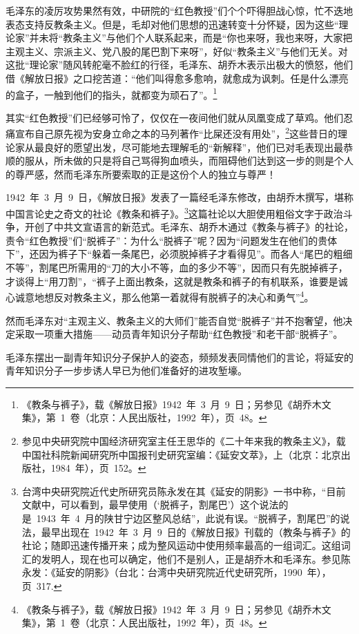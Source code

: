 毛泽东的凌厉攻势果然有效，中研院的“红色教授”们个个吓得胆战心惊，忙不迭地表态支持反教条主义。但是，毛却对他们思想的迅速转变十分怀疑，因为这些“理论家”并未将“教条主义”与他们个人联系起来，而是“你也来呀，我也来呀，大家把主观主义、宗派主义、党八股的尾巴割下来呀”，好似“教条主义”与他们无关。对这批“理论家”随风转舵毫不脸红的行径，毛泽东、胡乔木表示出极大的愤怒，他们借《解放日报》之口挖苦道：“他们叫得愈多愈响，就愈成为讽刺。任是什么漂亮的盒子，一触到他们的指头，就都变为顽石了”。\footnote{《教条与裤子》，载《解放日报》1942~年~3~月~9~日；另参见《胡乔木文集》，第~1~卷（北京：人民出版社，1992~年），页~48。}

其实“红色教授”们已经够可怜了，仅仅在一夜间他们就从凤凰变成了草鸡。他们忍痛宣布自己原先视为安身立命之本的马列著作“比屎还没有用处”，\footnote{参见中央研究院中国经济研究室主任王思华的《二十年来我的教条主义》，载中国社科院新闻研究所中国报刊史研究室编：《延安文萃》，上（北京：北京出版社，1984~年），页~152。}这些昔日的理论家从最良好的愿望出发，尽可能地去理解毛的“新解释”，他们已对毛表现出最恭顺的服从，所未做的只是将自己骂得狗血喷头，而阻碍他们达到这一步的则是个人的尊严感，然而毛泽东所要索取的正是这份个人的独立与尊严！


1942~年~3~月~9~日，《解放日报》发表了一篇经毛泽东修改，由胡乔木撰写，堪称中国言论史之奇文的社论《教条和裤子》。\footnote{台湾中央研究院近代史所研究员陈永发在其《延安的阴影》一书中称，“目前文献中，可以看到，最早使用（‘脱裤子，割尾巴’）这个说法的是~1943~年~4~月的陕甘宁边区整风总结”，此说有误。“脱裤子，割尾巴”的说法，最早出现在~1942~年~3~月~9~日的《解放日报》刊载的（教条与裤子》的社论；随即迅速传播开来；成为整风运动中使用频率最高的一组词汇。这组词汇的发明人，现在也可以确定，他们不是别人，正是胡乔木和毛泽东。参见陈永发：《延安的阴影》（台北：台湾中央研究院近代史研究所，1990~年），页~317.}这篇社论以大胆使用粗俗文字于政治斗争，开创了中共文宣语言的新范式。毛泽东、胡乔木通过《教条与裤子》的社论，责令“红色教授”们“脱裤子”：为什么“脱裤子”呢？因为“问题发生在他们的贵体下”，还因为裤子下“躲着一条尾巴，必须脱掉裤子才看得见”。而各人“尾巴的粗细不等”，割尾巴所需用的“刀的大小不等，血的多少不等”，因而只有先脱掉裤子，才谈得上“用刀割”，“裤子上面出教条，这就是教条和裤子的有机联系，谁要是诚心诚意地想反对教条主义，那么他第一着就得有脱裤子的决心和勇气”\footnote{《教条与裤子》，载《解放日报》1942~年~3~月~9~日；另参见《胡乔木文集》，第~1~卷（北京：人民出版社，1992~年），页~48。}。

然而毛泽东对“主观主义、教条主义的大师们”能否自觉“脱裤子”并不抱奢望，他决定采取一项重大措施——动员青年知识分子帮助“红色教授”和老干部“脱裤子”。

毛泽东摆出一副青年知识分子保护人的姿态，频频发表同情他们的言论，将延安的青年知识分子一步步诱人早已为他们准备好的进攻堑壕。


